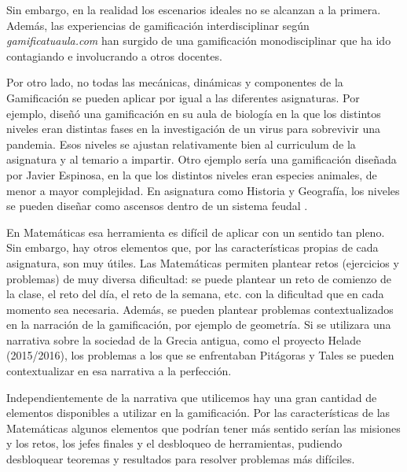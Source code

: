 Sin embargo, en la realidad los escenarios ideales no se alcanzan a la primera.
%
Además, las experiencias de gamificación interdisciplinar según \textit{gamificatuaula.com} han surgido de una gamificación monodisciplinar que ha ido contagiando e involucrando a otros docentes.


Por otro lado, no todas las mecánicas, dinámicas y componentes de la Gamificación se pueden aplicar por igual a las diferentes asignaturas.
%
Por ejemplo, \cite{ClassAVideogame} diseñó una gamificación en su aula de biología en la que los distintos niveles eran distintas fases en la investigación de un virus para sobrevivir una pandemia.
%
Esos niveles se ajustan relativamente bien al curriculum de la asignatura y al temario a impartir.
%
Otro ejemplo sería una gamificación diseñada por Javier Espinosa, en la que los distintos niveles eran especies animales, de menor a mayor complejidad.
%
En asignatura como Historia y Geografía, los niveles se pueden diseñar como ascensos dentro de un sistema feudal \citep{Feudal}.

En Matemáticas esa herramienta es difícil de aplicar con un sentido tan pleno.
%
Sin embargo, hay otros elementos que, por las características propias de cada asignatura, son muy útiles.
%
Las Matemáticas permiten plantear retos (ejercicios y problemas) de muy diversa dificultad: se puede plantear un reto de comienzo de la clase, el reto del día, el reto de la semana, etc. con la dificultad que en cada momento sea necesaria.
%
Además, se pueden plantear problemas contextualizados en la narración de la gamificación, por ejemplo de geometría.
%
Si se utilizara una narrativa sobre la sociedad de la Grecia antigua, como el proyecto Helade (2015/2016), los problemas a los que se enfrentaban Pitágoras y Tales se pueden contextualizar en esa narrativa a la perfección.


Independientemente de la narrativa que utilicemos hay una gran cantidad de elementos disponibles a utilizar en la gamificación. 
%
Por las características de las Matemáticas algunos elementos que podrían tener más sentido serían las misiones y los retos, los jefes finales y el desbloqueo de herramientas, pudiendo desbloquear teoremas y resultados para resolver problemas más difíciles.
